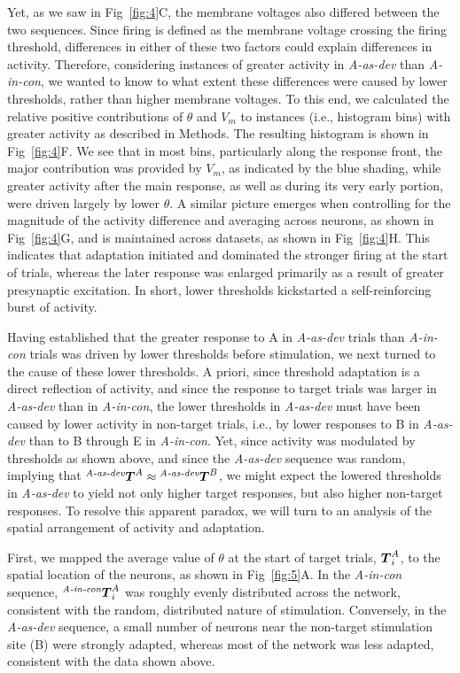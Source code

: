 \documentclass[10pt,letterpaper]{article}
\newcommand{\dev}{\textit{A-as-dev}}
\newcommand{\msc}{\textit{A-in-con}}
\newcommand{\std}{\textit{A-as-std}}
\newcommand{\ifstringequal}[4]{%
  \ifnum\pdfstrcmp{#1}{#2}=0
  #3%
  \else
  #4%
  \fi
}
\newcommand{\seqreplace}[1]{\ifstringequal{dev}{#1}{\dev}{%
    \ifstringequal{std}{#1}{\std}{%
        \ifstringequal{msc}{#1}{\msc}{#1}%
    }%
}}
\newcommand{\T}[3][]{{}^{\seqreplace{#1}}_{}\boldsymbol T^{#2}_{#3}}
\newcommand{\FIG}[1]{Fig~\ref{fig:#1}}
\begin{document}
Yet, as we saw in \FIG{4}C, the membrane voltages also differed between the two sequences. Since firing is defined as the membrane voltage crossing the firing threshold, differences in either of these two factors could explain differences in activity. Therefore, considering instances of greater activity in \dev{} than \msc{}, we wanted to know to what extent these differences were caused by lower thresholds, rather than higher membrane voltages. To this end, we calculated the relative positive contributions of $\theta$ and $V_m$ to instances (i.e., histogram bins) with greater activity as described in Methods. The resulting histogram is shown in \FIG{4}F. We see that in most bins, particularly along the response front, the major contribution was provided by $V_m$, as indicated by the blue shading, while greater activity after the main response, as well as during its very early portion, were driven largely by lower $\theta$.
A similar picture emerges when controlling for the magnitude of the activity difference and averaging across neurons, as shown in \FIG{4}G, and is maintained across datasets, as shown in \FIG{4}H. This indicates that adaptation initiated and dominated the stronger firing at the start of trials, whereas the later response was enlarged primarily as a result of greater presynaptic excitation. In short, lower thresholds kickstarted a self-reinforcing burst of activity.

Having established that the greater response to A in \dev{} trials than \msc{} trials was driven by lower thresholds before stimulation, we next turned to the cause of these lower thresholds. A priori, since threshold adaptation is a direct reflection of activity, and since the response to target trials was larger in \dev{} than in \msc{}, the lower thresholds in \dev{} must have been caused by lower activity in non-target trials, i.e., by lower responses to B in \dev{} than to B through E in \msc{}. Yet, since activity was modulated by thresholds as shown above, and since the \dev{} sequence was random, implying that $\T[dev]{A}{} \approx \T[dev]{B}{}$, we might expect the lowered thresholds in \dev{} to yield not only higher target responses, but also higher non-target responses. To resolve this apparent paradox, we will turn to an analysis of the spatial arrangement of activity and adaptation.

First, we mapped the average value of $\theta$ at the start of target trials, $\T{A}{i}$, to the spatial location of the neurons, as shown in \FIG{5}A. In the \msc{} sequence, $\T[msc]{A}{i}$ was roughly evenly distributed across the network, consistent with the random, distributed nature of stimulation. Conversely, in the \dev{} sequence, a small number of neurons near the non-target stimulation site (B) were strongly adapted, whereas most of the network was less adapted, consistent with the data shown above.
\end{document}
